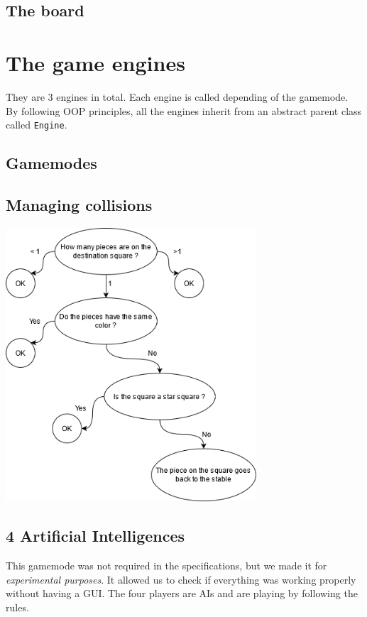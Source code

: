 \documentclass[english, 11pt, titlepage]{article}
\begin{document}
    \subsection{The board}

    \section{The game engines}
    They are 3 engines in total. Each engine is called depending of the gamemode. By following OOP principles, all the engines inherit from an abstract parent class called \verb|Engine|.
    \subsection{Gamemodes}
    \subsection{Managing collisions}
    \begin{center}
        \includegraphics[width=0.7\textwidth]{Logigram.png}
    \end{center}

    \subsection{4 Artificial Intelligences}
    This gamemode was not required in the specifications, but we made it for \emph{experimental purposes}. It allowed us to check if everything was working properly without having a GUI. The four players are AIs and are playing by following the rules.
\end{document}
